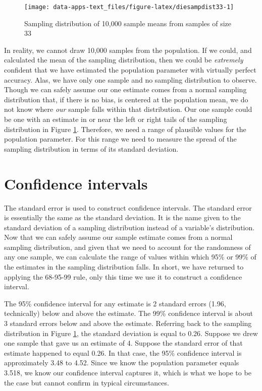 \documentclass[
]{book}
\begin{document}
\begin{figure}

{\centering \texttt{[image: data-apps-text\_files/figure-latex/diesampdist33-1]} 

}

\caption{Sampling distribution of 10,000 sample means from samples of size 33}\label{fig:diesampdist33}
\end{figure}

In reality, we cannot draw 10,000 samples from the population. If we could, and calculated the mean of the sampling distribution, then we could be \emph{extremely} confident that we have estimated the population parameter with virtually perfect accuracy. Alas, we have only one sample and no sampling distribution to observe. Though we can safely assume our one estimate comes from a normal sampling distribution that, if there is no bias, is centered at the population mean, we do not know where \emph{our} sample falls within that distribution. Our one sample could be one with an estimate in or near the left or right tails of the sampling distribution in Figure \ref{fig:diesampdist33}. Therefore, we need a range of plausible values for the population parameter. For this range we need to measure the spread of the sampling distribution in terms of its standard deviation.

\hypertarget{confidence-intervals}{%
\section{Confidence intervals}\label{confidence-intervals}}

The standard error is used to construct confidence intervals. The standard error is essentially the same as the standard deviation. It is the name given to the standard deviation of a sampling distribution instead of a variable's distribution. Now that we can safely assume our sample estimate comes from a normal sampling distribution, and given that we need to account for the randomness of any one sample, we can calculate the range of values within which 95\% or 99\% of the estimates in the sampling distribution falls. In short, we have returned to applying the 68-95-99 rule, only this time we use it to construct a confidence interval.

The 95\% confidence interval for any estimate is 2 standard errors (1.96, technically) below and above the estimate. The 99\% confidence interval is about 3 standard errors below and above the estimate. Referring back to the sampling distribution in Figure \ref{fig:diesampdist33}, the standard deviation is equal to 0.26. Suppose we drew one sample that gave us an estimate of 4. Suppose the standard error of that estimate happened to equal 0.26. In that case, the 95\% confidence interval is approximately 3.48 to 4.52. Since we know the population parameter equals 3.518, we know our confidence interval captures it, which is what we hope to be the case but cannot confirm in typical circumstances.
\end{document}
